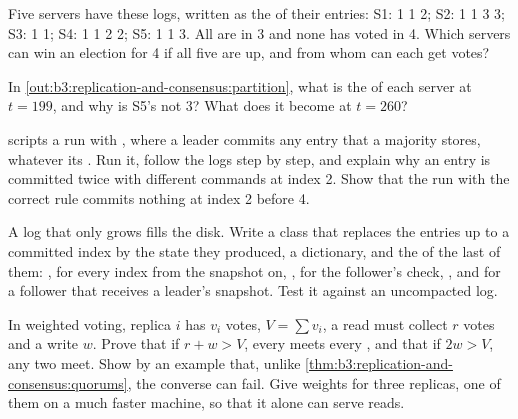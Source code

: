 \begin{exercise}[$\star$]\label{exo:b3:replication-and-consensus:3}
Five servers have these logs, written as the  of their entries: S1: 1 1 2; S2: 1 1 3 3; S3: 1 1; S4: 1 1 2 2; S5: 1 1 3. All are in  3 and none has voted in  4. Which servers can win an election for  4 if all five are up, and from whom can each get votes?
\end{exercise}

\begin{exercise}[$\star$]\label{exo:b3:replication-and-consensus:4}
In \cref{out:b3:replication-and-consensus:partition}, what is the  of each server at $t = 199$, and why is S5's not 3? What does it become at $t = 260$?
\end{exercise}

\begin{exercise}[$\star\star$]\label{exo:b3:replication-and-consensus:5}
 scripts a run with , where a leader commits any entry that a majority stores, whatever its . Run it, follow the logs step by step, and explain why an entry is committed twice with different commands at index 2. Show that the run with the correct rule commits nothing at index 2 before  4.
\end{exercise}

\begin{exercise}[$\star\star$]\label{exo:b3:replication-and-consensus:6}
A log that only grows fills the disk. Write a class  that replaces the entries up to a committed index by the state they produced, a dictionary, and the  of the last of them: ,  for every index from the snapshot on, ,  for the follower's check, , and  for a follower that receives a leader's snapshot. Test it against an uncompacted log.
\end{exercise}

\begin{exercise}[$\star\star$]\label{exo:b3:replication-and-consensus:7}
In weighted voting, replica $i$ has $v_i$ votes, $V = \sum v_i$, a read must collect $r$ votes and a write $w$. Prove that if $r + w > V$, every  meets every , and that if $2w > V$, any two  meet. Show by an example that, unlike \cref{thm:b3:replication-and-consensus:quorums}, the converse can fail. Give weights for three replicas, one of them on a much faster machine, so that it alone can serve reads.
\end{exercise}

